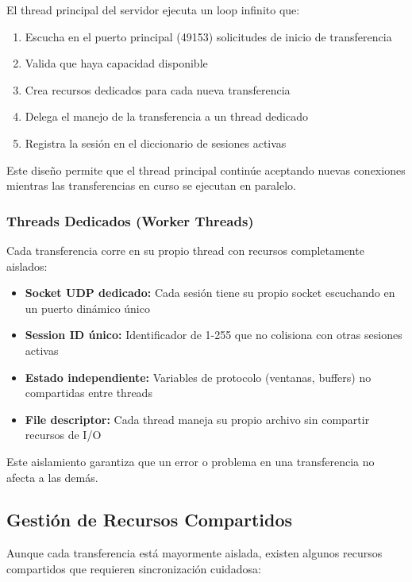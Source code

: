 El thread principal del servidor ejecuta un loop infinito que:

\begin{enumerate}
    \item Escucha en el puerto principal (49153) solicitudes de inicio de transferencia
    \item Valida que haya capacidad disponible
    \item Crea recursos dedicados para cada nueva transferencia
    \item Delega el manejo de la transferencia a un thread dedicado
    \item Registra la sesión en el diccionario de sesiones activas
\end{enumerate}

Este diseño permite que el thread principal continúe aceptando nuevas conexiones mientras las transferencias en curso se ejecutan en paralelo.

\subsubsection{Threads Dedicados (Worker Threads)}

Cada transferencia corre en su propio thread con recursos completamente aislados:

\begin{itemize}
    \item \textbf{Socket UDP dedicado:} Cada sesión tiene su propio socket escuchando en un puerto dinámico único
    \item \textbf{Session ID único:} Identificador de 1-255 que no colisiona con otras sesiones activas
    \item \textbf{Estado independiente:} Variables de protocolo (ventanas, buffers) no compartidas entre threads
    \item \textbf{File descriptor:} Cada thread maneja su propio archivo sin compartir recursos de I/O
\end{itemize}

Este aislamiento garantiza que un error o problema en una transferencia no afecta a las demás.

\subsection{Gestión de Recursos Compartidos}

Aunque cada transferencia está mayormente aislada, existen algunos recursos compartidos que requieren sincronización cuidadosa:

